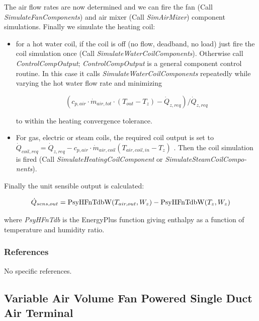 The air flow rates are now determined and we can fire the fan (Call \emph{SimulateFanComponents}) and air mixer (Call \emph{SimAirMixer}) component simulations. Finally we simulate the heating coil:

\begin{itemize}
  \item
    for a hot water coil, if the coil is off (no flow, deadband, no load) just fire the coil simulation once (Call \emph{SimulateWaterCoilComponents}). Otherwise call \emph{ControlCompOutput}; \emph{ControlCompOutput} is a general component control routine. In this case it calls \emph{SimulateWaterCoilComponents} repeatedly while varying the hot water flow rate and minimizing

\begin{equation}
({c_{p,air}}\cdot {\dot m_{air,tot}}\cdot ({T_{out}} - {T_z}) - {\dot Q_{z,req}})/{\dot Q_{z,req}}
\end{equation}

to within the heating convergence tolerance.

  \item
    For gas, electric or steam coils, the required coil output is set to \({\dot Q_{coil,req}} = {\dot Q_{z,req}} - {c_{p,air}}\cdot {\dot m_{air,coil}}({T_{air,coil,in}} - {T_z})\) . Then the coil simulation is fired (Call \emph{SimulateHeatingCoilComponent} or \emph{SimulateSteamCoilCompo-nents}).
\end{itemize}

Finally the unit sensible output is calculated:

\begin{equation}
{\dot Q_{sens,out}} = {\rm{PsyHFnTdbW}}({T_{air,out}},{W_z}) - {\rm{PsyHFnTdbW(}}{T_z},{W_z})
\end{equation}

where \emph{PsyHFnTdb} is the EnergyPlus function giving enthalpy as a function of temperature and humidity ratio.

\subsubsection{References}\label{references-2}

No specific references.

\subsection{Variable Air Volume Fan Powered Single Duct Air Terminal}\label{variable-air-volume-fan-powered-single-duct-air-terminal}

